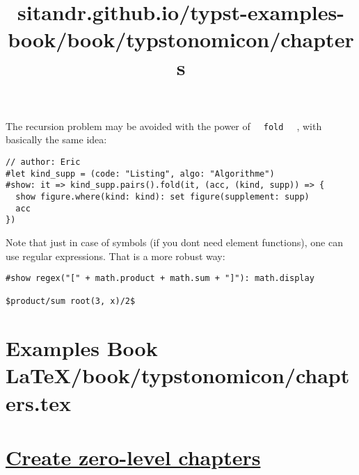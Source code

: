 \pandocbounded{}

The recursion problem may be avoided with the power of
\texttt{\ }{\texttt{\ fold\ }}\texttt{\ } , with basically the same
idea:

\begin{verbatim}
// author: Eric
#let kind_supp = (code: "Listing", algo: "Algorithme")
#show: it => kind_supp.pairs().fold(it, (acc, (kind, supp)) => {
  show figure.where(kind: kind): set figure(supplement: supp)
  acc
})
\end{verbatim}

\pandocbounded{}

Note that just in case of symbols (if you don\textquotesingle t need
element functions), one can use regular expressions. That is a more
robust way:

\begin{verbatim}
#show regex("[" + math.product + math.sum + "]"): math.display

$product/sum root(3, x)/2$
\end{verbatim}

\pandocbounded{}


\section{Examples Book LaTeX/book/typstonomicon/chapters.tex}
\title{sitandr.github.io/typst-examples-book/book/typstonomicon/chapters}

\section{\texorpdfstring{\hyperref[create-zero-level-chapters]{Create
zero-level
chapters}}{Create zero-level chapters}}\label{create-zero-level-chapters}

